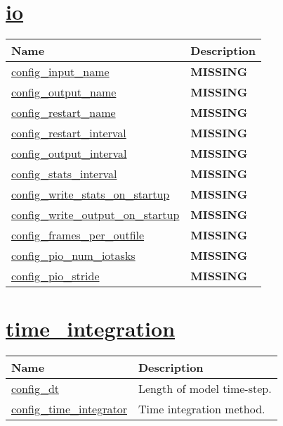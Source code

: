 \section[io]{\hyperref[sec:nm_sec_io]{io}}
\label{sec:nm_tab_io}
{\small
\begin{center}
\begin{longtable}{| p{2.0in} || p{4.0in} |}
	\hline
	{\bf Name} & {\bf Description} \\
	\hline
	\hline
	\hyperref[subsec:nm_sec_config_input_name]{config\_input\_name} & {\bf \color{red} MISSING} \\
	\hline
	\hyperref[subsec:nm_sec_config_output_name]{config\_output\_name} & {\bf \color{red} MISSING} \\
	\hline
	\hyperref[subsec:nm_sec_config_restart_name]{config\_restart\_name} & {\bf \color{red} MISSING} \\
	\hline
	\hyperref[subsec:nm_sec_config_restart_interval]{config\_restart\_interval} & {\bf \color{red} MISSING} \\
	\hline
	\hyperref[subsec:nm_sec_config_output_interval]{config\_output\_interval} & {\bf \color{red} MISSING} \\
	\hline
	\hyperref[subsec:nm_sec_config_stats_interval]{config\_stats\_interval} & {\bf \color{red} MISSING} \\
	\hline
	\hyperref[subsec:nm_sec_config_write_stats_on_startup]{config\_write\_stats\_on\_startup} & {\bf \color{red} MISSING} \\
	\hline
	\hyperref[subsec:nm_sec_config_write_output_on_startup]{config\_write\_output\_on\_startup} & {\bf \color{red} MISSING} \\
	\hline
	\hyperref[subsec:nm_sec_config_frames_per_outfile]{config\_frames\_per\_outfile} & {\bf \color{red} MISSING} \\
	\hline
	\hyperref[subsec:nm_sec_config_pio_num_iotasks]{config\_pio\_num\_iotasks} & {\bf \color{red} MISSING} \\
	\hline
	\hyperref[subsec:nm_sec_config_pio_stride]{config\_pio\_stride} & {\bf \color{red} MISSING} \\
	\hline
\end{longtable}
\end{center}
}
\section[time\_integration]{\hyperref[sec:nm_sec_time_integration]{time\_integration}}
\label{sec:nm_tab_time_integration}

{\small
\begin{center}
\begin{longtable}{| p{2.0in} || p{4.0in} |}
	\hline
	{\bf Name} & {\bf Description} \\
	\hline
	\hline
	\hyperref[subsec:nm_sec_config_dt]{config\_dt} & Length of model time-step. \\
	\hline
	\hyperref[subsec:nm_sec_config_time_integrator]{config\_time\_integrator} & Time integration method. \\
	\hline
\end{longtable}
\end{center}
}
